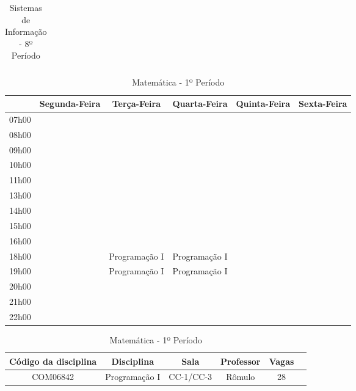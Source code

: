 \begin{apendices}
\begin{table}[!h]
\begin{adjustbox}{width=1\textwidth,center=\textwidth}
\begin{tabular}{|c|c|c|c|c|c|}
\end{tabular}
\end{adjustbox}
\caption{Sistemas de Informação - 8º Período}
\end{table}


\begin{table}[!h]
\begin{adjustbox}{width=1\textwidth,center=\textwidth}
\centering
\begin{tabular}{|c|c|c|c|c|c|}
\hline
 & Segunda-Feira & Terça-Feira & Quarta-Feira & Quinta-Feira & Sexta-Feira \\ \hline
07h00 &  &  &  &  &  \\ \hline
08h00 &  &  &  &  &  \\ \hline
09h00 &  &  &  &  &  \\ \hline
10h00 &  &  &  &  &  \\ \hline
11h00 &  &  &  &  &  \\ \hline
13h00 &  &  &  &  &  \\ \hline
14h00 &  &  &  &  &  \\ \hline
15h00 &  &  &  &  &  \\ \hline
16h00 &  &  &  &  &  \\ \hline
18h00 &  & Programação I & Programação I &  &  \\ \hline
19h00 &  & Programação I & Programação I &  &  \\ \hline
20h00 &  &  &  &  &  \\ \hline
21h00 &  &  &  &  &  \\ \hline
22h00 &  &  &  &  &  \\ \hline

\end{tabular}
\end{adjustbox}
\begin{adjustbox}{width=1\textwidth,center=\textwidth}
\centering
\begin{tabular}{|c|c|c|c|c|c|}
\hline
\textbf{Código da disciplina} & \textbf{Disciplina} & \textbf{Sala} & \textbf{Professor} & \textbf{Vagas} \\ \hline
COM06842 & Programação I & CC-1/CC-3 & Rômulo & 28 \\ \hline

\end{tabular}
\end{adjustbox}
\caption{Matemática - 1º Período}
\end{table}



\end{apendices}
